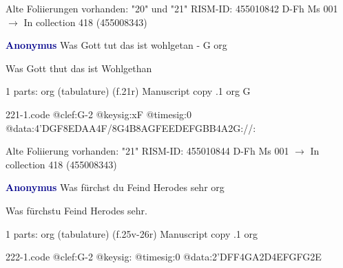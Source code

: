\documentclass[twocolumn]{book}
\begin{document}
\newline Alte Foliierungen vorhanden: "20" und "21"
\newline RISM-ID: 455010842
\newline D-Fh  Ms 001
\newline $\rightarrow$ In collection 418 (455008343)
      
\newline \par \vspace{7pt} \textcolor{darkblue}{\textbf{Anonymus  }}
\newline Was Gott tut das ist wohlgetan - G
\newline org
\newline \begin{itshape} Was Gott thut das ist Wohlgethan\end{itshape} 
\newline \textcolor{darkblue}{}  1 parts: org (tabulature)  (f.21r)
\newline Manuscript copy
.1  org  G  
\begin{filecontents*}{221-1.code}
@clef:G-2
@keysig:xF
@timesig:0
@data:4'DGF{8ED}{AA}4F/8G4B8A{GFEE}{DEFG}{BB}4A2G://:
\end{filecontents*}
\newline
%

\newline Alte Foliierung vorhanden: "21"
\newline RISM-ID: 455010844
\newline D-Fh  Ms 001
\newline $\rightarrow$ In collection 418 (455008343)
      
\newline \par \vspace{7pt} \textcolor{darkblue}{\textbf{Anonymus  }}
\newline Was fürchst du Feind Herodes sehr
\newline org
\newline \begin{itshape}[f.25v, at left:] Was fürchstu Feind Herodes sehr.\end{itshape} 
\newline \textcolor{darkblue}{}  1 parts: org (tabulature)  (f.25v-26r)
\newline Manuscript copy
.1  org  
\begin{filecontents*}{222-1.code}
@clef:G-2
@keysig:
@timesig:0
@data:2'DFF4GA2D4EFGFG2E
\end{filecontents*}
\newline
%
\end{document}
